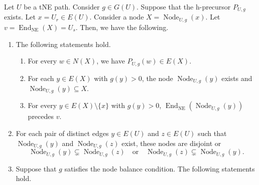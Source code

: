 \begin{lemma}\label{lem:node-structure}
Let $U$ be a tNE path. Consider $g\in G(U)$. Suppose that the h-precursor $P_{U,g}$ exists.
Let $x=U_r\in E(U)$. Consider a node $X=\operatorname{Node}_{U,g}(x)$.
Let $v=\operatorname{End}_{\mathrm{NE}}(X)=U_s$.
Then, we have the following.

\begin{enumerate}
\item\label{c:node-internal} The following statements hold.
\begin{enumerate}[label=(\alph*),ref=\theenumi(\alph*)]
\item\label{c:node-predecessors} For every $w\in N(X)$, we have
$P_{U,g}(w)\in E(X)$.
\item\label{c:node-contained} For each $y\in E(X)$ with $g(y)>0$,
the node $\operatorname{Node}_{U,g}(y)$ exists and
$\operatorname{Node}_{U,g}(y)\subseteq X$.
\item\label{c:node-ends} For every $y\in E(X)\setminus\{x\}$ with $g(y)>0$,
$\operatorname{End}_{\mathrm{NE}}(\operatorname{Node}_{U,g}(y))$ precedes $v$.
\end{enumerate}
\item\label{c:node-nesting} For each pair of distinct edges $y\in E(U)$ and $z\in E(U)$
such that $\operatorname{Node}_{U,g}(y)$ and $\operatorname{Node}_{U,g}(z)$ exist,
these nodes are disjoint or
\[
 \operatorname{Node}_{U,g}(y)\subsetneq\operatorname{Node}_{U,g}(z)
 \quad\text{or}\quad
 \operatorname{Node}_{U,g}(z)\subsetneq\operatorname{Node}_{U,g}(y).
\]
\item\label{c:node-balances} Suppose that $g$ satisfies the node balance condition. The following statements hold.


\end{enumerate}
\end{lemma}
